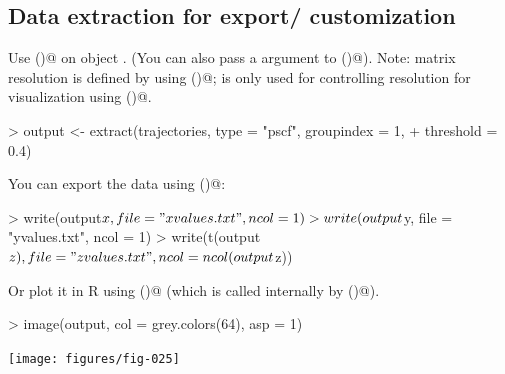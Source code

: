 \documentclass{article}
\renewenvironment{Schunk}{\vspace{\topsep}}{\vspace{\topsep}}
\begin{document}
\subsection{Data extraction for export/ customization}

Use \verb@extract()@ on object \verb@trajectories@. (You can also pass
a \verb@threshold@ argument to \verb@extract()@). Note: matrix
resolution is defined by \verb@xygrid@ using \verb@definegrid()@;
\verb@ninterp@ is only used for controlling resolution for
visualization using \verb@showmap()@.
\begin{Schunk}
\begin{Sinput}
> output <- extract(trajectories, type = "pscf", groupindex = 1, 
+     threshold = 0.4)
\end{Sinput}
\end{Schunk}

You can export the data using \verb@write()@:
\begin{Schunk}
\begin{Sinput}
> write(output$x, file = "xvalues.txt", ncol = 1)
> write(output$y, file = "yvalues.txt", ncol = 1)
> write(t(output$z), file = "zvalues.txt", ncol = ncol(output$z))
\end{Sinput}
\end{Schunk}

Or plot it in R using \verb@image()@ (which is called internally by
\verb@showmap()@). 
\begin{Schunk}
\begin{Sinput}
> image(output, col = grey.colors(64), asp = 1)
\end{Sinput}
\end{Schunk}
\texttt{[image: figures/fig-025]}
\end{document}
